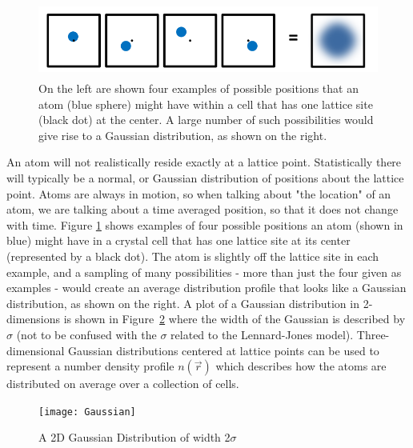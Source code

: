 \documentclass[double,12pt]{beavtex}
\begin{document}
\begin{figure}
  \centering
  \includegraphics[height=2.5cm]{Ensemble_Gaussian.png}
  \caption{On the left are shown four examples of possible positions 
  that an atom (blue sphere) might have within a cell that has one 
  lattice site (black dot) at the center. A large number of such 
  possibilities would give rise to a Gaussian distribution, 
  as shown on the right.}
  \label{fig:Ensemble_Gaus}
\end{figure} 

An atom will not realistically reside exactly at a lattice point. 
Statistically there will typically be a normal, or Gaussian distribution 
of positions about the lattice point. 
Atoms are always in motion, so when talking about "the location" 
of an atom, we are talking about a time averaged position, so that it 
does not change with time.
Figure \ref{fig:Ensemble_Gaus} shows examples 
of four possible positions an atom (shown in blue) might have in a crystal 
cell that has one lattice site at its center (represented by a black dot). 
The atom is slightly off the lattice site in each example, and 
a sampling of many possibilities - more than just the four given 
as examples - would create an average distribution profile that looks 
like a Gaussian distribution, as shown on the right.
A plot of a Gaussian distribution in 2-dimensions is shown in 
Figure~\ref{fig:Gaus_plot} where the width of the Gaussian is described 
by $\sigma$ (not to be confused with the $\sigma$ related to the 
Lennard-Jones model). 
Three-dimensional Gaussian distributions centered at lattice points can be 
used to represent a number density profile $n(\vec{r})$  which describes 
how the atoms are distributed on average over a collection of cells. 

\begin{figure}
  \centering
  \texttt{[image: Gaussian]}
  \caption{A 2D Gaussian Distribution of width 2$\sigma$}
  \label{fig:Gaus_plot}
\end{figure}  
  
\end{document}
